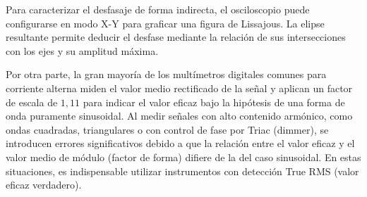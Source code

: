 Para caracterizar el desfasaje de forma indirecta, el osciloscopio puede configurarse en modo X-Y para graficar una
figura de Lissajous. La elipse resultante permite deducir el desfase mediante la relación de sus intersecciones con los
ejes y su amplitud máxima.

Por otra parte, la gran mayoría de los multímetros digitales comunes para corriente alterna miden el valor medio
rectificado de la señal y aplican un factor de escala de $1,11$ para indicar el valor eficaz bajo la hipótesis de una
forma de onda puramente sinusoidal. Al medir señales con alto contenido armónico, como ondas cuadradas, triangulares o
con control de fase por Triac (dimmer), se introducen errores significativos debido a que la relación entre el valor
eficaz y el valor medio de módulo (factor de forma) difiere de la del caso sinusoidal. En estas situaciones, es
indispensable utilizar instrumentos con detección True RMS (valor eficaz verdadero).

